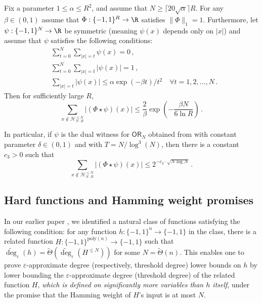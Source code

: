 \documentclass{toc}
\newcommand{\poly}{\mathrm{poly}}
\newcommand{\OR}{\mathsf{ OR}}
\newcommand{\bits}{\{-1,1\}}
\newcommand{\ls}{\star}
\newcommand{\eps}{\varepsilon}
\newcommand{\adeg}{\widetilde{\operatorname{deg}}}
\begin{document}
\begin{lemma} \label{prop:prelim-mass}
	Fix a parameter $1 \leq \alpha \leq R^2$, and assume that $N \geq \lceil 20 \sqrt{\alpha} \rceil R$.
	For any $\beta \in (0,1)$
	assume that $\Phi : \bits^R \to \R$ satisfies $\|\Phi\|_1=1$. Furthermore, let $\psi : \bits^N \to \R$ be symmetric
	(meaning $\psi(x)$ depends only on $|x|$) and assume that $\psi$ satisfies the following conditions: 
	\begin{align}
&\sum_{t = 0}^N \sum_{|x|=t} \psi(x) = 0\,, \label{eqn:omega-balanced}\\
&\sum_{t = 0}^N \sum_{|x| = t} |\psi(x)| = 1\,, \label{eqn:omega-norm}\\
&\sum_{|x| = t} |\psi(x)| \le \alpha \exp (-\beta t) / t^2 \quad \forall t = 1, 2, \dots, N\,. \label{eqn:omega-decay}
	\end{align}
	Then for sufficiently large $R$, 
	\begin{equation}
	\sum_{x \notin \mathcal{H}^{\le N}_{N \cdot R}} |(\Phi \ls \psi)(x)| \le \frac{2}{\beta} \exp\left(-\frac{\beta N}{6 \ln R}\right)\,.
	\label{eqn:prelim-mass}
	\end{equation}
	
	In particular, if $\psi$ is the dual witness for $\OR_N$ obtained from  with constant parameter $\delta \in (0, 1)$ and with $T=N/\log^3(N)$,
	then there is a constant $c_3 > 0$ such that
	\begin{equation}
	\sum_{x \notin \mathcal{H}^{\le N}_{N \cdot R}} |(\Phi \ls \psi)(x)| \le 2^{-c_3 \cdot \sqrt{N \log N}}\,. \label{eqn:prelim-mass-OR}
	\end{equation}
\end{lemma}


\subsection{Hard functions and Hamming weight promises}

In our %
earlier paper %
\cite{adegsurj}, we identified a natural class 
of functions satisfying the following %
condition: %
for any function $h \colon \bits^n \to \bits$ in the class,
there is a related function $H \colon \bits^{\poly(n)} \to \bits$ such that 
$\adeg_{\eps}(h) = \tilde{\Theta}(\adeg_{\eps}(H^{\leq N}))$ for some $N=\tilde{\Theta}(n)$.
This enables one to prove $\eps$-approximate degree (respectively, threshold degree) lower bounds on $h$ by lower bounding
the $\eps$-approximate degree (threshold degree) of the related function $H$, \emph{which is defined on significantly more
	variables than $h$ itself}, under the promise that the Hamming weight of $H$'s input is at most $N$.
\end{document}
